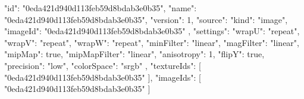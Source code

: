 {
  "id": "0eda421d940d113feb59d8bdab3e0b35",
  "name": "0eda421d940d113feb59d8bdab3e0b35",
  "version": 1,
  "source": {
    "kind": "image",
    "imageId": "0eda421d940d113feb59d8bdab3e0b35"
  },
  "settings": {
    "wrapU": "repeat",
    "wrapV": "repeat",
    "wrapW": "repeat",
    "minFilter": "linear",
    "magFilter": "linear",
    "mipMap": true,
    "mipMapFilter": "linear",
    "anisotropy": 1,
    "flipY": true,
    "precision": "low",
    "colorSpace": "srgb"
  },
  "textureIds": [
    "0eda421d940d113feb59d8bdab3e0b35"
  ],
  "imageIds": [
    "0eda421d940d113feb59d8bdab3e0b35"
  ]
}
